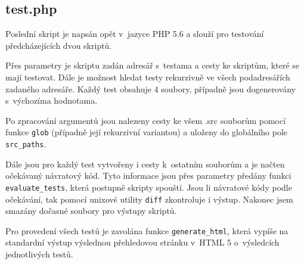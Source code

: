 \documentclass[10pt, a4paper]{article}
\begin{document}
\subsection*{test.php}
	Poslední skript je napsán opět v~jazyce PHP 5.6 a slouží pro testování předcházejících dvou skriptů.

	Přes parametry je skriptu zadán adresář s~testama a cesty ke skriptům, které se mají testovat. Dále je možnost hledat testy rekurzivně ve všech podadresářích zadaného adresáře. Každý test obsahuje 4 soubory, případně jsou dogenerovány s~výchozíma hodnotama.

	Po zpracování argumentů jsou nalezeny cesty ke všem .src souborům pomocí funkce \texttt{glob} (případně její rekurzivní variantou) a uloženy do globálního pole \texttt{src\_paths}.

	Dále jsou pro každý test vytvořeny i cesty k~ostatním souborům a je načten očekávaný návratový kód. Tyto informace jsou přes parametry předány funkci \texttt{evaluate\_tests}, která postupně skripty spouští. Jsou li návratové kódy podle očekávání, tak pomocí unixové utility \texttt{diff} zkontroluje i výstup. Nakonec jsem smazány dočasné soubory pro výstupy skriptů.

	Pro provedení všech testů je zavolána funkce \texttt{generate\_html}, která vypíše na standardní výstup výslednou přehledovou stránku v~HTML 5 o~výsledcích jednotlivých testů.
\end{document}
